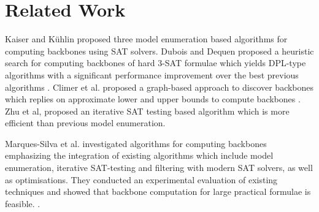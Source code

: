 \section{Related Work}\label{sec:relw}

Kaiser and K\"{u}hlin proposed three model enumeration based algorithms for computing backbones \cite{KKW2001} using SAT solvers.
%
Dubois and Dequen proposed a heuristic search for computing backbones of hard 3-SAT formulae which yields DPL-type algorithms with a significant
performance improvement over the best previous algorithms \cite{DD2001}.
Climer et al. proposed a graph-based approach to discover backbones which replies on approximate lower and upper bounds to compute
backbones \cite{CZ2002}.%
%
%
Zhu et al, proposed an iterative SAT testing based algorithm \cite{ZWSM11,ZWM11} which is more efficient than previous model enumeration.

Marques-Silva et al.  investigated algorithms for computing backbones emphasizing the integration of existing algorithms which include model enumeration, iterative SAT-testing and filtering with modern SAT solvers, as well as optimisations.
They conducted an experimental evaluation of existing techniques and showed that backbone computation for large practical formulae is feasible. \cite{MJML2010,JLMS12,JLM15}.





